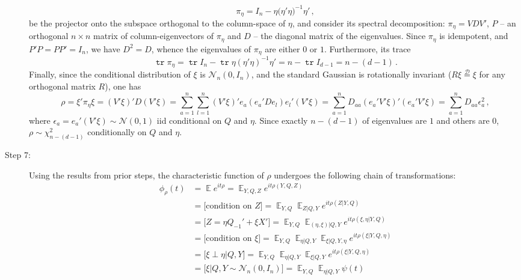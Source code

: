 \documentclass[a4paper,14pt]{article}
\newcommand{\ex}{\mathop{\mathbb{E}}\nolimits}
\newcommand{\Ncal}{\mathcal{N}}
\newcommand{\tr}{\mathop{\mathtt{tr}}\nolimits}
\begin{document}
\begin{description}
    $$ \pi_\eta = I_n - \eta \bigl(\eta'\eta\bigr)^{-1}\eta' \,, $$
    be the projector onto the subspace orthogonal to the column-space of $\eta$, and
    consider its spectral decomposition: $\pi_\eta = V D V'$, $P$ -- an orthogonal
    $n\times n$ matrix of column-eigenvectors of $\pi_\eta$ and $D$ -- the diagonal
    matrix of the eigenvalues. Since $\pi_\eta$ is idempotent, and $P'P = PP' = I_n$,
    we have $D^2=D$, whence the eigenvalues of $\pi_\eta$ are either $0$ or $1$. Furthermore,
    its trace
    $$ \tr \pi_\eta
        = \tr I_n - \tr \eta(\eta'\eta)^{-1}\eta'
        = n - \tr I_{d-1}
        = n - (d - 1)
        \,. $$
    Finally, since the conditional distribution of $\xi$ is $\Ncal_n(0, I_n)$, and
    the standard Gaussian is rotationally invariant ($R\xi \overset{\mathcal{D}}{=} \xi$
    for any orthogonal matrix $R$), one has
    $$ \rho
        = \xi' \pi_\eta \xi
        = (V'\xi)' D (V'\xi)
        = \sum_{a=1}^n \sum_{l=1}^n (V'\xi)'e_a (e_a' D e_l) e_l' (V'\xi)
        = \sum_{a=1}^n D_{aa} (e_a' V'\xi)' (e_a' V'\xi)
        = \sum_{a=1}^n D_{aa} \epsilon_a^2
        \,,$$
    where $\epsilon_a = e_a' (V'\xi) \sim \Ncal(0,1)$ iid conditional on $Q$ and $\eta$.
    Since exactly $n-(d-1)$ of eigenvalues are $1$ and others are $0$, $\rho \sim \chi^2_{n - (d-1)}$
    conditionally on $Q$ and $\eta$.
    \item[Step 7:] Using the results from prior steps, the characteristic function of $\rho$
    undergoes the following chain of transformations:
    \begin{align*}
        \phi_{\rho}(t)
            &= \ex e^{i t \rho}
            = \ex_{Y, Q, Z} e^{i t \rho(Y, Q, Z)}\\
            &= \bigl[\text{condition on } Z\bigr]
            = \ex_{Y, Q} \ex_{Z | Q, Y} e^{i t \rho(Z| Y, Q)}\\
            &= \bigl[Z =\eta Q_{-1}' + \xi X' \bigr]
            =\ex_{Y, Q} \ex_{(\eta, \xi) | Q, Y} e^{i t \rho(\xi, \eta | Y, Q)}\\
            &= \bigl[\text{condition on } \xi\bigr]
            = \ex_{Y, Q} \ex_{\eta | Q, Y} \ex_{\xi| Q, Y, \eta} e^{i t \rho(\xi | Y, Q, \eta)} \\ 
            &= \bigl[\xi \perp \eta | Q, Y \bigr]
            = \ex_{Y, Q} \ex_{\eta | Q, Y} \ex_{\xi| Q, Y} e^{i t \rho(\xi | Y, Q, \eta)} \\
            &= \bigl[{\xi | Q, Y} \sim \Ncal_n(0, I_n)\bigr]
            = \ex_{Y, Q} \ex_{\eta | Q, Y} \psi(t) \\

\end{align*}
\end{description}
\end{document}
